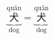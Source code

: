 \[ \underbrace{\overset{\text{quǎn}}{\text{犬}}}_{\text{dog}} = \underbrace{\overset{\text{quǎn}}{\text{犬}}}_{\text{dog}} \]
